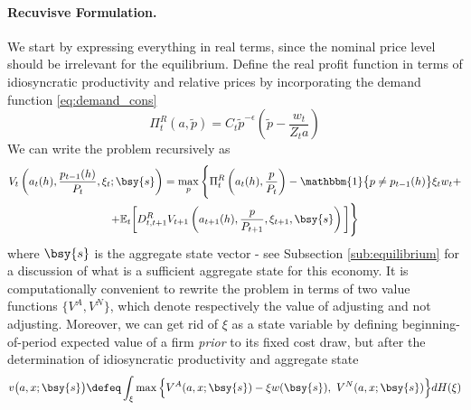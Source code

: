 \documentclass[a4paper,10pt]{article}  %
\begin{document}
\paragraph{Recuvisve Formulation.} %
\label{par:recuvisve_formulation}
We start by expressing everything in real terms, since the nominal price level should be irrelevant for 
the equilibrium. Define the real profit function in terms of idiosyncratic productivity and relative prices by
incorporating the demand function \eqref{eq:demand_cons}
\begin{equation}
   \label{eq:profit_function}
   \Pi^R_t (a, \tilde{p}) = C_t \tilde{p}^{-\epsilon} \left( \tilde{p} - \frac{w_t}{Z_t a}\right)
\end{equation}
We can write the problem recursively as
\begin{multline}
   V_t \left( a_t(h), \frac{ p_{t-1}(h) }{ P_t }, \xi_t;  \bsy{s}  \right) = 
   \max_{p} 
   \Bigg\{
      \Pi^R_t \left( a_t(h), \frac{ p }{ P_t } \right) 
      -\mathbbm{1} \big\{ p \ne p_{t-1}(h ) \big\} \xi_t  w_t + \\
      + \mathbb{E}_t \bigg[ D^R_{t,t+1} V_{t+1} \left( a_{t+1}(h), \frac{ p }{ P_{t+1} }, \xi_{t+1}, \bsy{s} \right) \bigg] \Bigg\}
\end{multline}
where $\bsy{s}$ is the aggregate state vector - see Subsection \ref{sub:equilibrium} for a discussion of what is a sufficient aggregate
state for this economy.
It is computationally convenient to rewrite the problem in terms of two value functions $ \big\{V^A,V^N \big\} $, which denote
respectively the value of adjusting and not adjusting. Moreover, we can get rid of $ \xi $ as a state variable by defining beginning-
of-period expected value of a firm \emph{prior} to its fixed cost draw, but after the determination of idiosyncratic productivity and
aggregate state
\begin{equation}
   \label{eq:value_fnc01}
   v \big(a, x;  \bsy{s}  \big) \defeq \int_{\xi} \max \Big\{ V^A(a,x;  \bsy{s}  ) - \xi w(\bsy{s}) , \ V^N(a,x ;  \bsy{s}  )  \Big\} dH(\xi )
\end{equation}
\end{document}
